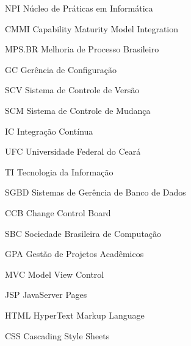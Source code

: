 \begin{siglas}
  \item[NPI] Núcleo de Práticas em Informática
  \item[CMMI] Capability Maturity Model Integration
  \item[MPS.BR] Melhoria de Processo Brasileiro
  \item[GC] Gerência de Configuração
  \item[SCV] Sistema de Controle de Versão
  \item[SCM] Sistema de Controle de Mudança
  \item[IC]  Integração Contínua
  \item[UFC] Universidade Federal do Ceará
  \item[TI] Tecnologia da Informação
  \item[SGBD] Sistemas de Gerência de Banco de Dados
  \item[CCB] Change Control Board
  \item[SBC] Sociedade Brasileira de Computação
  \item[GPA] Gestão de Projetos Acadêmicos
  \item[MVC] Model View Control
  \item[JSP] JavaServer Pages
  \item[HTML] HyperText Markup Language
  \item[CSS] Cascading Style Sheets
\end{siglas}
